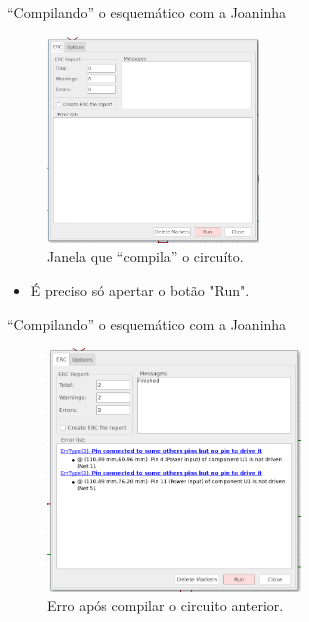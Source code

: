 \documentclass{beamer}
\begin{document}
\begin{frame}{``Compilando'' o esquemático com a Joaninha}
	\begin{figure}
		\centering
		\includegraphics[width=0.5\textwidth]{Imagens/09_joaninha_janela.png}
		\caption{Janela que ``compila'' o circuíto.}
	\end{figure}
	\pause
	\begin{itemize}
		\item É preciso só apertar o botão "Run".
	\end{itemize}
\end{frame}

\begin{frame}{``Compilando'' o esquemático com a Joaninha}
	\begin{figure}
		\centering
		\includegraphics[width=0.6\textwidth]{Imagens/10_joaninha_erro.png}
		\caption{Erro após compilar o circuito anterior.}
	\end{figure}
\end{frame}
\end{document}
